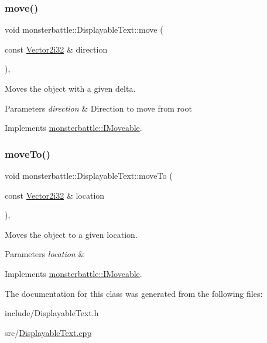 \subsubsection{\texorpdfstring{move()}{move()}}
{\footnotesize\ttfamily void monsterbattle\+::\+Displayable\+Text\+::move (\begin{DoxyParamCaption}\item[{const \hyperlink{structmonsterbattle_1_1Vector}{Vector2i32} \&}]{direction }\end{DoxyParamCaption})\hspace{0.3cm}{\ttfamily [override]}, {\ttfamily [virtual]}}



Moves the object with a given delta. 


\begin{DoxyParams}{Parameters}
{\em direction} & Direction to move from root \\
\hline
\end{DoxyParams}


Implements \hyperlink{structmonsterbattle_1_1IMoveable_a487ec192d82b97e4c5b6d4706fc8db17}{monsterbattle\+::\+I\+Moveable}.

\mbox{\label{classmonsterbattle_1_1DisplayableText_afa4e1b76469663073b133d6358329887}} 
\subsubsection{\texorpdfstring{move\+To()}{moveTo()}}
{\footnotesize\ttfamily void monsterbattle\+::\+Displayable\+Text\+::move\+To (\begin{DoxyParamCaption}\item[{const \hyperlink{structmonsterbattle_1_1Vector}{Vector2i32} \&}]{location }\end{DoxyParamCaption})\hspace{0.3cm}{\ttfamily [override]}, {\ttfamily [virtual]}}



Moves the object to a given location. 


\begin{DoxyParams}{Parameters}
{\em location} & \\
\hline
\end{DoxyParams}


Implements \hyperlink{structmonsterbattle_1_1IMoveable_a61cc433b2a635cc3c52d807fc446a6a4}{monsterbattle\+::\+I\+Moveable}.



The documentation for this class was generated from the following files\+:\begin{DoxyCompactItemize}
\item 
include/Displayable\+Text.\+h\item 
src/\hyperlink{DisplayableText_8cpp}{Displayable\+Text.\+cpp}\end{DoxyCompactItemize}
